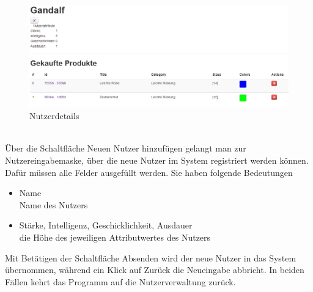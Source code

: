 \begin{figure}[h!]
  \centering
  \includegraphics[width=\textwidth]{UserManual/Nutzerdetails.png}
  \caption{Nutzerdetails}
  \label{fig:Nutzerdetails}
\end{figure}
\text{}\vspace*{-1em}\\
Über die Schaltfläche Neuen Nutzer hinzufügen gelangt man zur Nutzereingabemaske, über die neue Nutzer im System registriert werden können. Dafür müssen alle Felder ausgefüllt werden. Sie haben folgende Bedeutungen
\begin{itemize}
  \item Name \\
        Name des Nutzers
  \vspace*{-0.5em}
  \item Stärke, Intelligenz, Geschicklichkeit, Ausdauer \\
        die Höhe des jeweiligen Attributwertes des Nutzers
\end{itemize}
Mit Betätigen der Schaltfläche Absenden wird der neue Nutzer in das System übernommen, während ein Klick auf Zurück die Neueingabe abbricht. In beiden Fällen kehrt das Programm auf die Nutzerverwaltung zurück.


